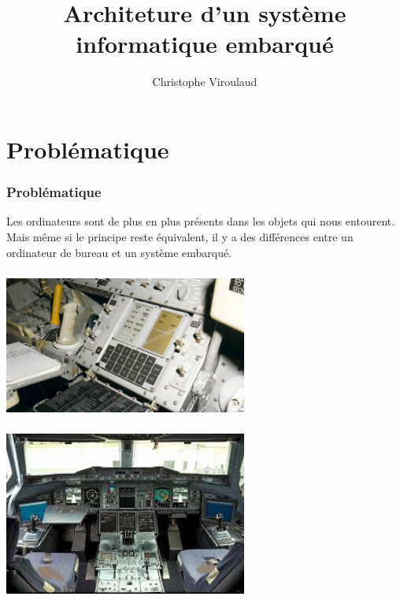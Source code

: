 \documentclass[svgnames,11pt]{beamer}
\author[]{Christophe Viroulaud}
\title{Architeture d'un système informatique embarqué}
\date{}
\institute{Seconde SNT}
\begin{document}
\begin{frame}
\titlepage
\end{frame}

\section{Problématique}
\begin{frame}
    \frametitle{Problématique}

    Les ordinateurs sont de plus en plus présents dans les objets qui nous entourent. Mais même si le principe reste équivalent, il y a des différences entre un ordinateur de bureau et un système embarqué.

\end{frame}
\begin{frame}
    \frametitle{}

    \begin{center}
    \centering
    \includegraphics[width=8cm]{ressources/apollo.jpeg}
    \label{IMG}
    \end{center}

\end{frame}
\begin{frame}
    \frametitle{}

    \begin{center}
    \centering
    \includegraphics[width=8cm]{ressources/a320.jpeg}
    \label{IMG}
    \end{center}

\end{frame}
\end{document}
